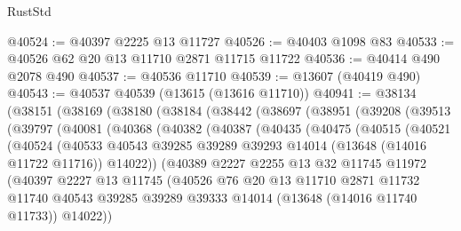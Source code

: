 \begin{lexlean}{RustStd}
\begin{coremodule}
@40524 := @40397 @2225 @13 @11727
@40526 := @40403 @1098 @83
@40533 := @40526 @62 @20 @13 @11710 @2871 @11715 @11722
@40536 := @40414 @490 @2078 @490
@40537 := @40536 @11710
@40539 := @13607 (@40419 @490)
@40543 := @40537 @40539 (@13615 (@13616 @11710))
@40941 := @38134
    (@38151
      (@38169
        (@38180
          (@38184
            (@38442
              (@38697
                (@38951
                  (@39208
                    (@39513
                      (@39797
                        (@40081
                          (@40368
                            (@40382
                              (@40387
                                (@40435
                                  (@40475
                                    (@40515
                                      (@40521
                                        (@40524
                                          (@40533
                                            @40543
                                            @39285
                                            @39289
                                            @39293
                                            @14014
                                            (@13648 (@14016 @11722 @11716))
                                            @14022))
                                        (@40389
                                          @2227
                                          @2255
                                          @13
                                          @32
                                          @11745
                                          @11972
                                          (@40397
                                            @2227
                                            @13
                                            @11745
                                            (@40526
                                              @76
                                              @20
                                              @13
                                              @11710
                                              @2871
                                              @11732
                                              @11740
                                              @40543
                                              @39285
                                              @39289
                                              @39333
                                              @14014
                                              (@13648 (@14016 @11740 @11733))
                                              @14022))

\end{coremodule}
\end{lexlean}
